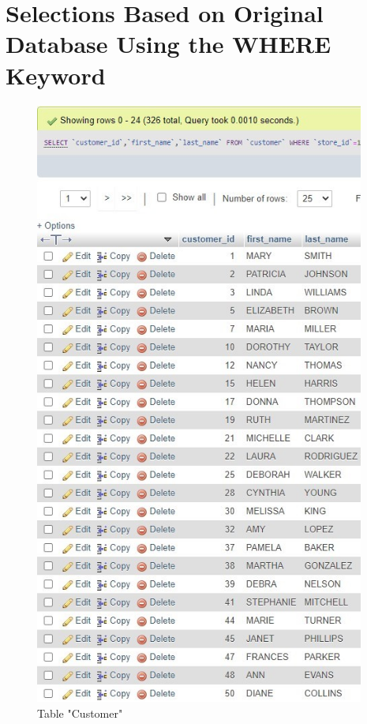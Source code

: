 \documentclass{article}
\begin{document}
\section{Selections Based on Original Database Using the WHERE Keyword} 
		\begin{figure}[H]
			\includegraphics[height = 20cm]{customer_selectwhere}
			\caption{Table "Customer"}
		\end{figure}
\end{document}
